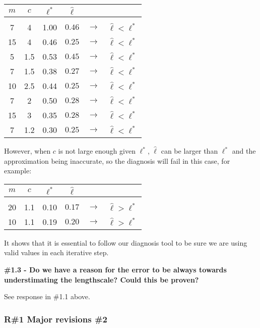 \documentclass[11pt]{report}
\begin{document}
\begin{table}[h]
\centering
\begin{tabular}{ c c c c c c }
$m$ & $c$ & $\ell^*$ & $\hat{\ell}$ & \\ 
\hline \\[-4mm]
7  & 4   & 1.00 & $0.46$ & $\to$ & $\hat{\ell} < \ell^*$ \\
15 & 4   & 0.46 & $0.25$ & $\to$ & $\hat{\ell} < \ell^*$ \\
5  & 1.5 & 0.53 & $0.45$ & $\to$ & $\hat{\ell} < \ell^*$ \\
7  & 1.5 & 0.38 & $0.27$ & $\to$ & $\hat{\ell} < \ell^*$ \\
10 & 2.5 & 0.44 & $0.25$ & $\to$ & $\hat{\ell} < \ell^*$ \\
7  & 2   & 0.50 & $0.28$ & $\to$ & $\hat{\ell} < \ell^*$ \\
15 & 3   & 0.35 & $0.28$ & $\to$ & $\hat{\ell} < \ell^*$ \\
7  & 1.2 & 0.30 & $0.25$ & $\to$ & $\hat{\ell} < \ell^*$ \\
\end{tabular}
\end{table}

However, when $c$ is not large enough given $\ell^*$, $\hat{\ell}$ can be larger than $\ell^*$ and the approximation being inaccurate, so the diagnosis will fail in this case, for example:

\begin{table}[h]
\centering
\begin{tabular}{ c c c c c c }
$m$ & $c$ & $\ell^*$ & $\hat{\ell}$ & \\ 
\hline \\[-4mm]
20 & 1.1 & 0.10 & $0.17$ & $\to$ & $\hat{\ell} > \ell^*$ \\
10 & 1.1 & 0.19 & $0.20$ & $\to$ & $\hat{\ell} > \ell^*$ \\
\end{tabular}
\end{table}

It shows that it is essential to follow our diagnosis tool to be sure we are using valid values in each iterative step.

\textbf{\#1.3 - Do we have a reason for the error to be always towards understimating the lengthscale? Could this be proven?}

See response in \#1.1 above.


\subsubsection*{R\#1 Major revisions \#2}
\end{document}
